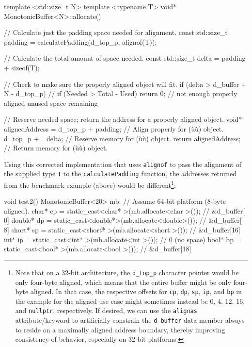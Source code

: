 \begin{emcppslisting}[emcppsbatch=e3]
template <std::size_t N>                                                        
template <typename T>
void* MonotonicBuffer<N>::allocate()
{
    // Calculate just the padding space needed for alignment.
    const std::size_t padding = calculatePadding(d_top_p, alignof(T));

    // Calculate the total amount of space needed.
    const std::size_t delta = padding + sizeof(T);

    // Check to make sure the properly aligned object will fit.
    if (delta > d_buffer + N - d_top_p)  // if (Needed > Total - Used)
    {
        return 0;  // not enough properly aligned unused space remaining
    }

    // Reserve needed space; return the address for a properly aligned object.
    void* alignedAddress = d_top_p + padding;  // Align properly for (ù{}ù) object.
    d_top_p += delta;                          // Reserve memory for (ù{}ù) object.
    return alignedAddress;                     // Return memory for (ù{}ù) object.
}
\end{emcppslisting}
    
\noindent Using this corrected implementation that uses \lstinline!alignof! to pass
the alignment of the supplied type \lstinline!T! to the
\lstinline!calculatePadding! function, the addresses returned from the
benchmark example (above) would be different{\cprotect\footnote{Note
that on a 32-bit architecture, the \lstinline!d_top_p! character
pointer would be only four-byte aligned, which means that the entire
buffer might be only four-byte aligned. In that case, the respective
offsets for \lstinline!cp!, \lstinline!dp!, \lstinline!sp!, \lstinline!ip!, and
\lstinline!bp! in the example for the aligned use case might sometimes
instead be 0, 4, 12, 16, and \lstinline!nullptr!, respectively. If
  desired, we can use the \lstinline!alignas!
  attribute/keyword to artificially constrain the \lstinline!d_buffer!
  data member always to reside on a maximally aligned address boundary,
  thereby improving consistency of behavior, especially on 32-bit
  platforms.}}:

\begin{emcppslisting}[emcppsbatch=e3]
void test2()
{
    MonotonicBuffer<20> mb;  // Assume 64-bit platform (8-byte aligned).
    char*   cp = static_cast<char*  >(mb.allocate<char  >());  // &d_buffer[ 0]
    double* dp = static_cast<double*>(mb.allocate<double>());  // &d_buffer[ 8]
    short*  sp = static_cast<short* >(mb.allocate<short >());  // &d_buffer[16]
    int*    ip = static_cast<int*   >(mb.allocate<int   >());  // 0 (no space)
    bool*   bp = static_cast<bool*  >(mb.allocate<bool  >());  // &d_buffer[18]
}
\end{emcppslisting}
    
